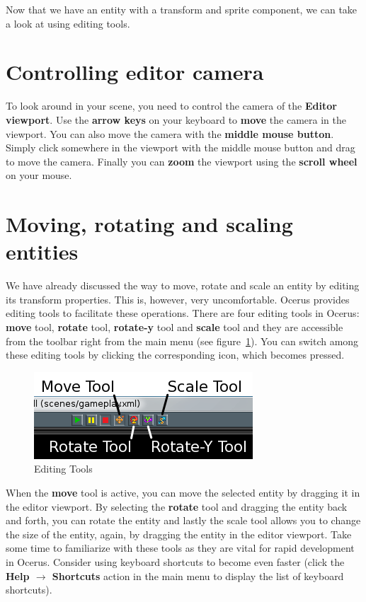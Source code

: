 \documentclass[a4paper,12pt]{article}
\begin{document}
Now that we have an entity with a transform and sprite component, we can take a look at using editing tools.

\section{Controlling editor camera}
To look around in your scene, you need to control the camera of the \textbf{Editor viewport}. Use the \textbf{arrow keys} on your keyboard to \textbf{move} the camera in the viewport. You can also move the camera with the \textbf{middle mouse button}. Simply click somewhere in the viewport with the middle mouse button and drag to move the camera. Finally you can \textbf{zoom} the viewport using the \textbf{scroll wheel} on your mouse.

\section{Moving, rotating and scaling entities}
We have already discussed the way to move, rotate and scale an entity by editing its transform properties. This is, however, very uncomfortable. Ocerus provides editing tools to facilitate these operations. There are four editing tools in Ocerus: \textbf{move} tool, \textbf{rotate} tool, \textbf{rotate-y} tool and \textbf{scale} tool and they are accessible from the toolbar right from the main menu (see figure~\ref{fig:editing_tools}). You can switch among these editing tools by clicking the corresponding icon, which becomes pressed.

\begin{figure}[ht]
 \begin{center}
  \includegraphics[scale=0.65]{EditingTools}
 \end{center}
 \caption{Editing Tools}
 \label{fig:editing_tools}
\end{figure}


When the \textbf{move} tool is active, you can move the selected entity by dragging it in the editor viewport. By selecting the \textbf{rotate} tool and dragging the entity back and forth, you can rotate the entity and lastly the scale tool allows you to change the size of the entity, again, by dragging the entity in the editor viewport. Take some time to familiarize with these tools as they are vital for rapid development in Ocerus. Consider using keyboard shortcuts to become even faster (click the \textbf{Help $\to$ Shortcuts} action in the main menu to display the list of keyboard shortcuts).
\end{document}
